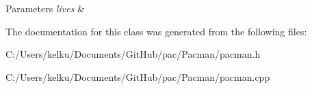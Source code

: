 \begin{DoxyParams}{Parameters}
{\em lives} & \\
\hline
\end{DoxyParams}


The documentation for this class was generated from the following files\+:\begin{DoxyCompactItemize}
\item 
C\+:/\+Users/kelku/\+Documents/\+Git\+Hub/pac/\+Pacman/pacman.\+h\item 
C\+:/\+Users/kelku/\+Documents/\+Git\+Hub/pac/\+Pacman/pacman.\+cpp\end{DoxyCompactItemize}
